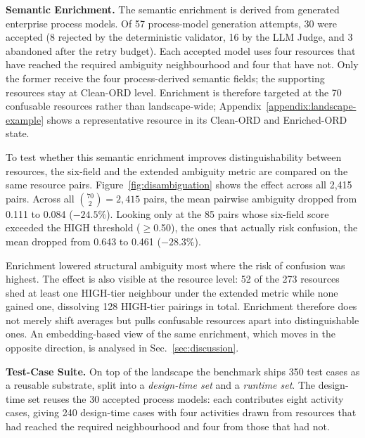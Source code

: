 \documentclass[10pt,twocolumn]{article}
\begin{document}
\textbf{Semantic Enrichment.} The semantic enrichment is derived from generated enterprise process models. Of 57 process-model generation attempts, 30 were accepted (8 rejected by the deterministic validator, 16 by the LLM Judge, and 3 abandoned after the retry budget). Each accepted model uses four resources that have reached the required ambiguity neighbourhood and four that have not. Only the former receive the four process-derived semantic fields; the supporting resources stay at Clean-ORD level. Enrichment is therefore targeted at the 70 confusable resources rather than landscape-wide; Appendix~\ref{appendix:landscape-example} shows a representative resource in its Clean-ORD and Enriched-ORD state.

To test whether this semantic enrichment improves distinguishability between resources, the six-field and the extended ambiguity metric are compared on the same resource pairs. Figure~\ref{fig:disambiguation} shows the effect across all 2{,}415 pairs. Across all $\binom{70}{2}{=}2{,}415$ pairs, the mean pairwise ambiguity dropped from 0.111 to 0.084 ($-24.5\%$). Looking only at the 85 pairs whose six-field score exceeded the HIGH threshold ($\geq$0.50), the ones that actually risk confusion, the mean dropped from 0.643 to 0.461 ($-28.3\%$).

Enrichment lowered structural ambiguity most where the risk of confusion was highest. The effect is also visible at the resource level: 52 of the 273 resources shed at least one HIGH-tier neighbour under the extended metric while none gained one, dissolving 128 HIGH-tier pairings in total. Enrichment therefore does not merely shift averages but pulls confusable resources apart into distinguishable ones. An embedding-based view of the same enrichment, which moves in the opposite direction, is analysed in Sec.~\ref{sec:discussion}.

\textbf{Test-Case Suite.} On top of the landscape the benchmark ships 350 test cases as a reusable substrate, split into a \emph{design-time set} and a \emph{runtime set}. The design-time set reuses the 30 accepted process models: each contributes eight activity cases, giving 240 design-time cases with four activities drawn from resources that had reached the required neighbourhood and four from those that had not.
\end{document}
